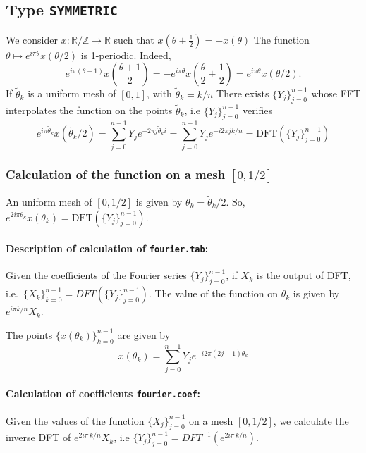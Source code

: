 \documentclass{article}
\begin{document}
\subsection{ Type \texttt{SYMMETRIC}}
We consider $x:\mathbb{R}/\mathbb{Z}\to \mathbb{R}$ such that $x(\theta+\frac 1 2)=-x(\theta)$ 
The function $\theta\mapsto e^{i\pi \theta} x(\theta/2)$ is 1-periodic. Indeed,
\begin{equation}
e^{i\pi(\theta+1)}x(\frac{\theta+1}{2})=-e ^{i\pi\theta} x(\frac{\theta}{2}+\frac 1 2) =
e^{i\pi\theta} x(\theta/2).
\end{equation}
If $\tilde{\theta}_k$ is a uniform mesh of $[0,1]$, with $\tilde{\theta}_k=k/n$ 
There exists $\{Y_j\}_{j=0}^{n-1}$ whose FFT interpolates the function on the points $\tilde{\theta}_k$, i.e 
$\{Y_j\}_{j=0}^{n-1}$ verifies 
\begin{equation}
e^{i\pi\tilde{\theta}_k} x(\tilde{\theta}_k/2)=
\sum^{n-1}_{j=0} Y_j e^{-2\pi j\tilde{\theta}_k i} =
\sum^{n-1}_{j=0} Y_j e^{-i2\pi j k /n}=\mbox{DFT}(\{Y_j\}_{j=0}^{n-1})
\end{equation}
\subsubsection{Calculation of the function on a mesh $[0,1/2]$}
An uniform mesh of $[0,1/2]$ is given by $\theta_k=\tilde{\theta}_k/2$. So,
$e^{2i\pi\theta_k} x(\theta_k)=\mbox{DFT}(\{Y_j\}_{j=0}^{n-1})$.

\paragraph{Description of calculation of \texttt{fourier.tab}:} Given the coefficients of the Fourier series $ \{Y_j\}_{j=0}^{n-1}$,
if $X_k$ is the output of DFT, i.e.~$\{ X_k
\}_{k=0}^{n-1}=DFT(\{Y_j\}_{j=0}^{n-1})$. The value of the function
on $\theta_k$ is given by $e^{i\pi k/n}X_k$. 

The points $ \{ x(\theta_k) \}_{k=0}^{n-1}$ are given by 
\begin{equation}
x(\theta_k)= \sum_{j=0}^{n-1} Y_j e^{-i2\pi(2j+1) \theta_k}
\end{equation}

\paragraph{Calculation of coefficients \texttt{fourier.coef}:} Given
the values  of the function  $ \{X_j\}_{j=0}^{n-1}$ on a mesh
$[0,1/2]$, we calculate the inverse DFT of $e^{2i\pi \, k /n}X_k$, i.e
$\{Y_j\}_{j=0}^{n-1}=DFT^{-1}(e^{2i\pi \, k /n})$. 
\end{document}
